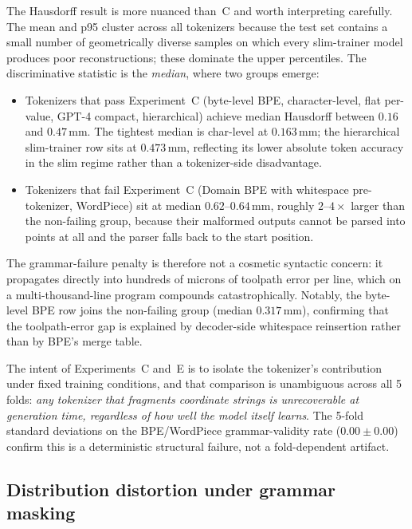 \documentclass[11pt]{article}
\begin{document}
The Hausdorff result is more nuanced than~C and worth interpreting carefully. The mean and p95 cluster across all tokenizers because the test set contains a small number of geometrically diverse samples on which every slim-trainer model produces poor reconstructions; these dominate the upper percentiles. The discriminative statistic is the \emph{median}, where two groups emerge:
\begin{itemize}[leftmargin=*, nosep]
    \item Tokenizers that pass Experiment~C (byte-level BPE, character-level, flat per-value, GPT-4 compact, hierarchical) achieve median Hausdorff between $0.16$ and $0.47$\,mm. The tightest median is char-level at $0.163$\,mm; the hierarchical slim-trainer row sits at $0.473$\,mm, reflecting its lower absolute token accuracy in the slim regime rather than a tokenizer-side disadvantage.
    \item Tokenizers that fail Experiment~C (Domain BPE with whitespace pre-tokenizer, WordPiece) sit at median $0.62$--$0.64$\,mm, roughly $2$--$4\times$ larger than the non-failing group, because their malformed outputs cannot be parsed into points at all and the parser falls back to the start position.
\end{itemize}
The grammar-failure penalty is therefore not a cosmetic syntactic concern: it propagates directly into hundreds of microns of toolpath error per line, which on a multi-thousand-line program compounds catastrophically. Notably, the byte-level BPE row joins the non-failing group (median $0.317$\,mm), confirming that the toolpath-error gap is explained by decoder-side whitespace reinsertion rather than by BPE's merge table.

The intent of Experiments~C and~E is to isolate the tokenizer's contribution under fixed training conditions, and that comparison is unambiguous across all 5 folds: \emph{any tokenizer that fragments coordinate strings is unrecoverable at generation time, regardless of how well the model itself learns}. The 5-fold standard deviations on the BPE/WordPiece grammar-validity rate ($0.00 \pm 0.00$) confirm this is a deterministic structural failure, not a fold-dependent artifact.

\subsection{Distribution distortion under grammar masking}
\label{sec:kl_measurement}
\end{document}
